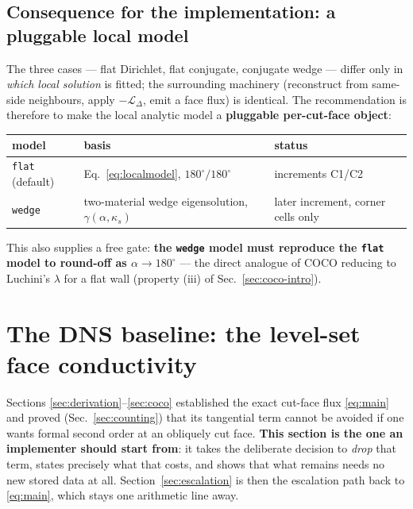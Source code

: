 \documentclass[11pt,a4paper]{article}
\newcommand{\code}[1]{\texttt{#1}}
\begin{document}
\subsection{Consequence for the implementation: a pluggable local model}
\label{sec:pluggable}

The three cases --- flat Dirichlet, flat conjugate, conjugate wedge --- differ
only in \emph{which local solution} is fitted; the surrounding machinery
(reconstruct from same-side neighbours, apply $-\mathcal{L}_\Delta$, emit a face
flux) is identical. The recommendation is therefore to make the local analytic
model a \textbf{pluggable per-cut-face object}:

\begin{center}
\begin{tabular}{@{}lll@{}}
\toprule
model & basis & status \\
\midrule
\code{flat} (default) & Eq.~\eqref{eq:localmodel}, $180^\circ/180^\circ$
  & increments C1/C2 \\
\code{wedge} & two-material wedge eigensolution, $\gamma(\alpha,\kappa_s)$
  & later increment, corner cells only \\
\bottomrule
\end{tabular}
\end{center}

\noindent
This also supplies a free gate: \textbf{the \code{wedge} model must reproduce
the \code{flat} model to round-off as $\alpha\to180^\circ$} --- the direct
analogue of COCO reducing to Luchini's $\lambda$ for a flat wall
(property (iii) of Sec.~\ref{sec:coco-intro}).

\section{The DNS baseline: the level-set face conductivity}
\label{sec:baseline}

Sections \ref{sec:derivation}--\ref{sec:coco} established the exact cut-face
flux \eqref{eq:main} and proved (Sec.~\ref{sec:counting}) that its tangential
term cannot be avoided if one wants formal second order at an obliquely cut
face. \textbf{This section is the one an implementer should start from}: it
takes the deliberate decision to \emph{drop} that term, states precisely what
that costs, and shows that what remains needs no new stored data at all.
Section~\ref{sec:escalation} is then the escalation path back to
\eqref{eq:main}, which stays one arithmetic line away.
\end{document}
